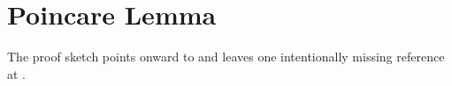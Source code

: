 
\section{Poincare Lemma}

The proof sketch points onward to  and leaves one intentionally
missing reference at .
